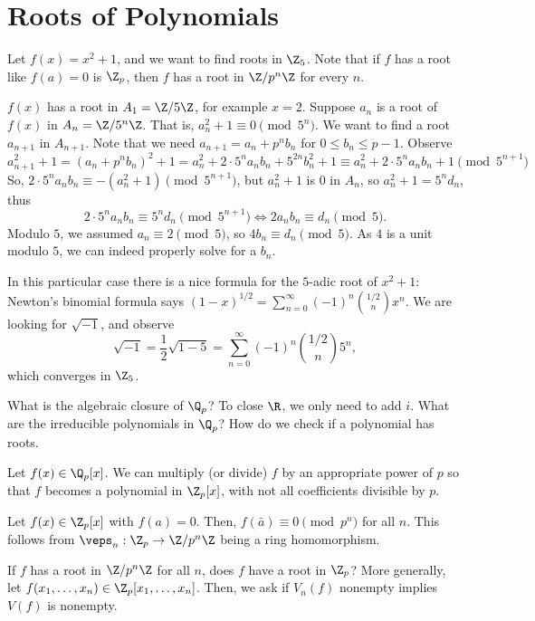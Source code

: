 \section{Roots of Polynomials}

Let $f(x) = x^2+1$, and we want to find roots in $\Z_5$. Note that if $f$ has a root like $f(a)=0$ is $\Z_p$, then $f$ has a root in $\Z/p^n\Z$ for every $n$.

$f(x)$ has a root in $A_1=\Z/5\Z$, for example $x=2$. Suppose $a_n$ is a root of $f(x)$ in $A_n=\Z/5^n\Z$. That is, $a_n^2+1 \equiv 0 \pmod {5^n}$. We want to find a root $a_{n+1}$ in $A_{n+1}$. Note that we need $a_{n+1}=a_n+p^{n}b_n$ for $0 \leq b_n \leq p-1$. Observe
$$a_{n+1}^2+1=(a_n+p^nb_n)^2+1=a_n^2+2\cdot 5^na_nb_n+5^{2n}b_n^2+1 \equiv a_n^2 + 2\cdot 5^na_nb_n+1 \pmod {5^{n+1}}$$
So, $2\cdot 5^na_nb_n \equiv -(a_n^2+1) \pmod{5^{n+1}}$, but $a_n^2+1$ is $0$ in $A_n$, so $a_n^2+1=5^nd_n$, thus
$$2\cdot 5^n a_nb_n\equiv 5^nd_n \pmod{5^{n+1}} \iff 2 a_nb_n \equiv d_n \pmod 5.$$
Modulo $5$, we assumed $a_n \equiv 2 \pmod 5$, so $4b_n \equiv d_n\pmod 5$. As $4$ is a unit modulo $5$, we can indeed properly solve for a $b_n$.

In this particular case there is a nice formula for the $5$-adic root of $x^2+1$: Newton's binomial formula says $(1-x)^{1/2}=\sum_{n=0}^\infty (-1)^n\binom{1/2}{n}x^n$. We are looking for $\sqrt{-1}$, and observe
$$\sqrt{-1}=\frac{1}{2}\sqrt{1-5}=\sum_{n=0}^\infty (-1)^n\binom{1/2}{n}5^n,$$
which converges in $\Z_5$.

\begin{notebox*}[Question]
    What is the algebraic closure of $\Q_p$? To close $\R$, we only need to add $i$. What are the irreducible polynomials in $\Q_p$? How do we check if a polynomial has roots.
\end{notebox*}

\begin{notebox*}[Observe]
    Let $f(x) \in \Q_p[x]$. We can multiply (or divide) $f$ by an appropriate power of $p$ so that $f$ becomes a polynomial in $\Z_p[x]$, with not all coefficients divisible by $p$.
\end{notebox*}

\begin{rmk}
    Let $f(x) \in \Z_p[x]$ with $f(a)=0$. Then, $f(\bar a) \equiv 0 \pmod {p^n}$ for all $n$. This follows from $\veps _n:\Z_p \to \Z/p^n\Z$ being a ring homomorphism.
\end{rmk}

\begin{notebox*}[Question]
    If $f$ has a root in $\Z/p^n\Z$ for all $n$, does $f$ have a root in $\Z_p$? More generally, let $f(x_1,\dots,x_n) \in \Z_p[x_1,\dots,x_n]$. Then, we ask if $V_n(f)$ nonempty implies $V(f)$ is nonempty.
\end{notebox*}

